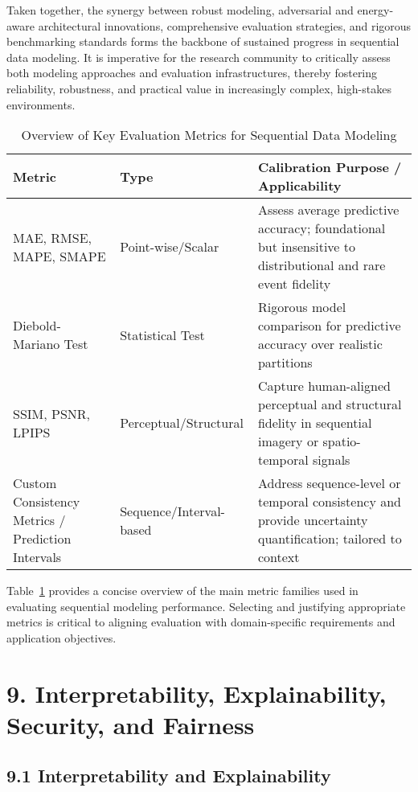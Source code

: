 \documentclass[11pt]{article}
\begin{document}
Taken together, the synergy between robust modeling, adversarial and energy-aware architectural innovations, comprehensive evaluation strategies, and rigorous benchmarking standards forms the backbone of sustained progress in sequential data modeling. It is imperative for the research community to critically assess both modeling approaches and evaluation infrastructures, thereby fostering reliability, robustness, and practical value in increasingly complex, high-stakes environments.

\begin{table}[ht]
    \centering
    \caption{Overview of Key Evaluation Metrics for Sequential Data Modeling}
    \label{tab:evaluation_metrics}
    \begin{tabular}{llp{7.5cm}}
        \toprule
        \textbf{Metric} & \textbf{Type} & \textbf{Calibration Purpose / Applicability} \\
        \midrule
        MAE, RMSE, MAPE, SMAPE & Point-wise/Scalar    & Assess average predictive accuracy; foundational but insensitive to distributional and rare event fidelity \\
        Diebold-Mariano Test    & Statistical Test     & Rigorous model comparison for predictive accuracy over realistic partitions \\
        SSIM, PSNR, LPIPS       & Perceptual/Structural & Capture human-aligned perceptual and structural fidelity in sequential imagery or spatio-temporal signals \\
        Custom Consistency Metrics / Prediction Intervals & Sequence/Interval-based & Address sequence-level or temporal consistency and provide uncertainty quantification; tailored to context \\
        \bottomrule
    \end{tabular}
\end{table}

Table~\ref{tab:evaluation_metrics} provides a concise overview of the main metric families used in evaluating sequential modeling performance. Selecting and justifying appropriate metrics is critical to aligning evaluation with domain-specific requirements and application objectives.

\section{9. Interpretability, Explainability, Security, and Fairness}

\subsection{9.1 Interpretability and Explainability}
\end{document}
